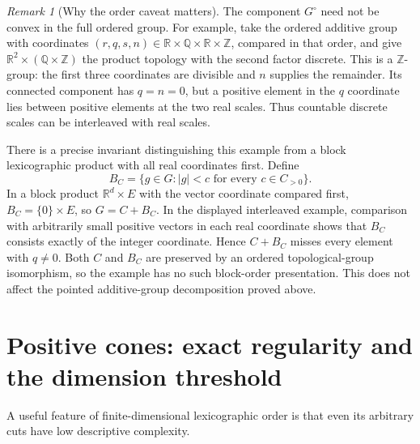 \documentclass[11pt]{article}
\numberwithin{equation}{section}
\theoremstyle{definition}
\theoremstyle{remark}
\newtheorem{remark}[remark]{Remark}
\newcommand{\Z}{\mathbb Z}
\newcommand{\Q}{\mathbb Q}
\newcommand{\R}{\mathbb R}
\begin{document}
\begin{remark}[Why the order caveat matters]
The component $G^\circ$ need not be convex in the full ordered group.
For example, take the ordered additive group with coordinates
$(r,q,s,n)\in\R\times\Q\times\R\times\Z$, compared in that order,
and give $\R^2\times(\Q\times\Z)$ the product topology with the second
factor discrete. This is a $\Z$-group: the first three coordinates are
divisible and $n$ supplies the remainder. Its connected component has
$q=n=0$, but a positive element in the $q$ coordinate lies between
positive elements at the two real scales. Thus countable discrete
scales can be interleaved with real scales.

There is a precise invariant distinguishing this example from a block
lexicographic product with all real coordinates first. Define
\[
 B_C=\{g\in G: |g|<c\text{ for every }c\in C_{>0}\}.
\]
In a block product $\R^d\times E$ with the vector coordinate compared
first, $B_C=\{0\}\times E$, so $G=C+B_C$. In the displayed interleaved
example, comparison with arbitrarily small positive vectors in each
real coordinate shows that $B_C$ consists exactly of the integer
coordinate. Hence $C+B_C$ misses every element with $q\ne0$.
Both $C$ and $B_C$ are preserved by an ordered topological-group
isomorphism, so the example has no such block-order presentation.
This does not affect the pointed additive-group decomposition proved above.
\end{remark}

\section{Positive cones: exact regularity and the dimension threshold}
\label{pma:lc:sec:cones}

A useful feature of finite-dimensional lexicographic order is that even
its arbitrary cuts have low descriptive complexity.
\end{document}
